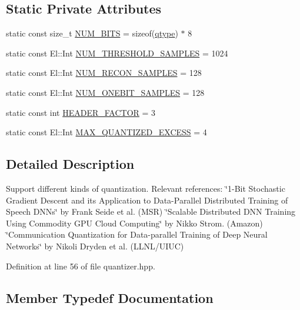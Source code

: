 \subsection*{Static Private Attributes}
\begin{DoxyCompactItemize}
\item 
static const size\+\_\+t \hyperlink{classlbann_1_1lbann__quantizer_a33ea17392f53b90e91aea1ffb7e11d68}{N\+U\+M\+\_\+\+B\+I\+TS} = sizeof(\hyperlink{classlbann_1_1lbann__quantizer_afcda642ff1b44d31eec910909c3d013e}{qtype}) $\ast$ 8
\item 
static const El\+::\+Int \hyperlink{classlbann_1_1lbann__quantizer_a7745dbc282bebe812ff5523a4b3df3f2}{N\+U\+M\+\_\+\+T\+H\+R\+E\+S\+H\+O\+L\+D\+\_\+\+S\+A\+M\+P\+L\+ES} = 1024
\item 
static const El\+::\+Int \hyperlink{classlbann_1_1lbann__quantizer_a10667e56db4218aac3912c6bae28fc41}{N\+U\+M\+\_\+\+R\+E\+C\+O\+N\+\_\+\+S\+A\+M\+P\+L\+ES} = 128
\item 
static const El\+::\+Int \hyperlink{classlbann_1_1lbann__quantizer_a8e25785452736c54861a69207a48252d}{N\+U\+M\+\_\+\+O\+N\+E\+B\+I\+T\+\_\+\+S\+A\+M\+P\+L\+ES} = 128
\item 
static const int \hyperlink{classlbann_1_1lbann__quantizer_afb4315625e371169cabfac56c3f75d37}{H\+E\+A\+D\+E\+R\+\_\+\+F\+A\+C\+T\+OR} = 3
\item 
static const El\+::\+Int \hyperlink{classlbann_1_1lbann__quantizer_abe63d57e62be1b498848f7920de4433a}{M\+A\+X\+\_\+\+Q\+U\+A\+N\+T\+I\+Z\+E\+D\+\_\+\+E\+X\+C\+E\+SS} = 4
\end{DoxyCompactItemize}


\subsection{Detailed Description}
Support different kinds of quantization. Relevant references\+: \char`\"{}1-\/\+Bit Stochastic Gradient Descent and its Application to Data-\/\+Parallel
\+Distributed Training of Speech D\+N\+Ns\char`\"{} by Frank Seide et al. (M\+SR) \char`\"{}\+Scalable Distributed D\+N\+N Training Using Commodity G\+P\+U Cloud Computing\char`\"{} by Nikko Strom. (Amazon) \char`\"{}\+Communication Quantization for Data-\/parallel Training of Deep Neural
\+Networks\char`\"{} by Nikoli Dryden et al. (L\+L\+N\+L/\+U\+I\+UC) 

Definition at line 56 of file quantizer.\+hpp.



\subsection{Member Typedef Documentation}
\mbox{\label{classlbann_1_1lbann__quantizer_afcda642ff1b44d31eec910909c3d013e}} 
